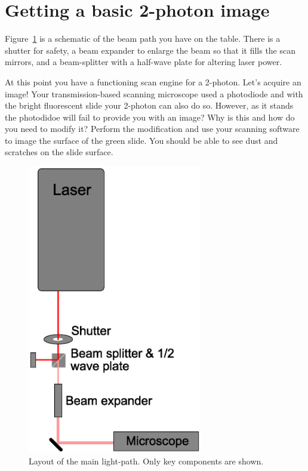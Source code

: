 \documentclass[a4paper]{report}
\begin{document}
\clearpage

\section{Getting a basic 2-photon image}
 Figure~\ref{fig:layout} is a schematic of the beam path you have on the table. 
There is a shutter for safety, a beam expander to enlarge the beam so that it fills the scan mirrors, and a beam-splitter with a half-wave plate for altering laser power. 

At this point you have a functioning scan engine for a 2-photon.
Let's acquire an image! 
Your transmission-based scanning microscope used a photodiode and with the bright fluorescent slide your 2-photon can also do so.
However, as it stands the photodidoe will fail to provide you with an image?
Why is this and how do you need to modify it?
Perform the modification and use your scanning software to image the surface of the green slide. You should be able to see dust and scratches on the slide surface. 
\begin{figure}[h]
\center
\includegraphics[width=3in]{2p_table_layout.eps}
\caption{Layout of the main light-path. Only key components are shown.}
\label{fig:layout}
\end{figure}

\clearpage
\end{document}
